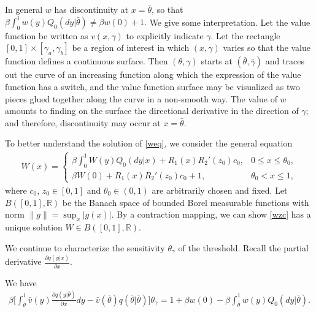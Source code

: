 \documentclass[graybox]{svmult}
\begin{document}
\begin{remark} \label{re:dis}
In general $w$ has discontinuity  at $x=\bar \theta$, so that
$\beta \int_0^1 w(y)Q_0(dy|\bar \theta)\ne  \beta w(0)+1.$
We give some interpretation. Let the value function be written as $v(x, \gamma)$ to explicitly indicate $\gamma$. Let the rectangle $[0,1]\times [\gamma_a, \gamma_b]$
 be a region of interest in which $(x,\gamma)$ varies so that the value function defines a continuous surface. Then $( \theta, \gamma)$ starts at $(\bar\theta, \bar\gamma)$ and traces out the curve of an increasing function along which the expression of the value function has a switch, and the value function surface may be visualized as two pieces glued together along the curve in a non-smooth way. The value of $w$ amounts to finding on the surface the directional derivative in the direction of $\gamma$; and therefore, discontinuity may occur at $x=\bar\theta$.
  \end{remark}

To better understand the solution of \eqref{weq},
we consider the  general equation
\begin{align}\label{wzc}
W(x)=
\begin{cases}
 \displaystyle
\beta \int_0^1 W(y)Q_0(dy|x)+R_1(x)R_2'(z_0) c_0, & 0\le x\le \theta_0,  \\
  \displaystyle
\beta W(0)+R_1(x)R_2'(z_0)c_0+1, &   \theta_0<x\le 1,
\end{cases}
\end{align}
where $c_0$, $z_0\in [0,1]$ and $\theta_0\in (0, 1)$ are arbitrarily chosen and fixed. Let $B([0,1], \mathbb{R})$ be the Banach space of bounded Borel measurable functions with norm $\|g\|=\sup_x |g(x)|$. By a contraction mapping, we can show \eqref{wzc} has a unique solution
$W\in B([0,1], \mathbb{R})$.

We continue to  characterize the  sensitivity $\theta_\gamma$ of the threshold.
Recall the partial derivative $\frac{\partial q(y|x)}{\partial x}$.
\begin{lemma}
We have
\begin{align} \label{bsiga}
\beta \Big[\int_{\bar \theta}^1 \bar v(y) \frac{\partial q(y|\bar\theta)}{\partial x} dy -\bar v(\bar \theta) q(\bar \theta|\bar \theta)\Big] \theta_\gamma=1+\beta w(0) -\beta \int_{\bar\theta}^1 w(y) Q_0(dy|\bar \theta).
\end{align}
\end{lemma}
\end{document}

